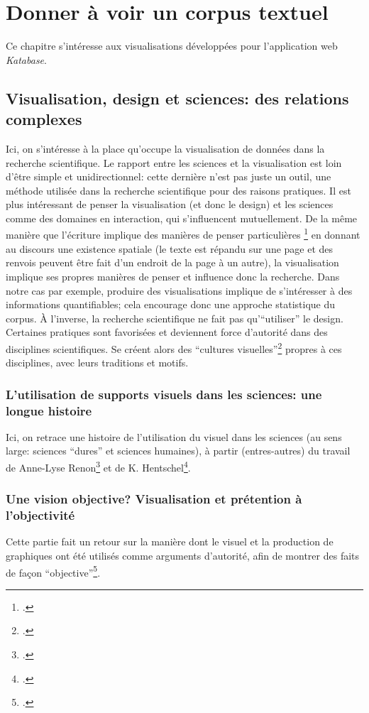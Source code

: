 \documentclass[a4paper, 12pt, twoside]{book}
\newcommand{\ktb}{\textit{Katabase}}
\begin{document}
\chapter{Donner à voir un corpus textuel}
Ce chapitre s'intéresse aux visualisations développées pour l'application web \ktb{}.

\section{Visualisation, design et sciences: des relations complexes}
Ici, on s'intéresse à la place qu'occupe la visualisation de données dans la recherche scientifique. Le rapport entre les sciences et la visualisation est loin d'être simple et unidirectionnel: cette dernière n'est pas juste un outil, une méthode utilisée dans la recherche scientifique pour des raisons pratiques. Il est plus intéressant de penser la visualisation (et donc le design) et les sciences comme des domaines en interaction, qui s'influencent mutuellement. De la même manière que l'écriture implique des manières de penser particulières \footcite[p. 111-116]{masure_design_2017} en donnant au discours une existence spatiale (le texte est répandu sur une page et des renvois peuvent être fait d'un endroit de la page à un autre), la visualisation implique ses propres manières de penser et influence donc la recherche. Dans notre cas par exemple, produire des visualisations implique de s'intéresser à des informations quantifiables; cela encourage donc une approche statistique du corpus. À l'inverse, la recherche scientifique ne fait pas qu'\enquote{utiliser} le design. Certaines pratiques sont favorisées et deviennent force d'autorité dans des disciplines scientifiques. Se créent alors des \enquote{cultures visuelles}\footcite[p. 14]{hentschel_visual_2014} propres à ces disciplines, avec leurs traditions et motifs.

\subsection{L'utilisation de supports visuels dans les sciences: une longue histoire}
Ici, on retrace une histoire de l'utilisation du visuel dans les sciences (au sens large: sciences \enquote{dures} et sciences humaines), à partir (entres-autres) du travail de Anne-Lyse Renon\footcite[p. 47-88]{renon_design_2016} et de K. Hentschel\footcite{hentschel_visual_2014}.

\subsection{Une vision objective? Visualisation et prétention à l'objectivité}
Cette partie fait un retour sur la manière dont le visuel et la production de graphiques ont été utilisés comme arguments d'autorité, afin de montrer des faits de façon \enquote{objective}\footcite{renon_design_2015}.
\end{document}
